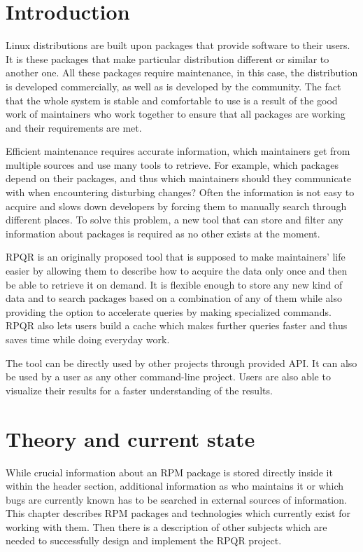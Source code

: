 \setlength{\parindent}{0em}
\setlength{\parskip}{1em}
\chapter{Introduction}

Linux distributions are built upon packages that provide software to their users. It is these
packages that make particular distribution different or similar to another one. All these packages require
maintenance, in this case, the distribution is developed commercially, as well as is developed by the community.
The fact that the whole system is stable and comfortable to use is a result of the good work of
maintainers who work together to ensure that all packages are working and their
requirements are met.

Efficient maintenance requires accurate information, which maintainers get from multiple sources
and use many tools to retrieve. For example, which packages depend on their packages, and thus which
maintainers should they communicate with when encountering disturbing changes? Often the information
is not easy to acquire and slows down developers by forcing them to manually search through different
places. To solve this problem, a new tool that can store and filter any information about
packages is required as no other exists at the moment.

RPQR is an originally proposed tool that is supposed to make maintainers' life easier by allowing them to describe how
to acquire the data only once and then be able to retrieve it on demand. It is flexible
enough to store any new kind of data and to search packages based on a combination of any of them while
also providing the option to accelerate queries by making specialized commands.
RPQR also lets users build a cache which makes further queries faster and thus saves time while
doing everyday work.

The tool can be directly used by other projects through provided API. It can also be used
by a user as any other command-line project. Users are also able to visualize their
results for a faster understanding of the results.

\chapter{Theory and current state}
While crucial information about an RPM package is stored directly inside it within the header section,
additional information as who maintains it or which bugs are currently known has to be searched
in external sources of information. This chapter describes RPM packages and technologies which
currently exist for working with them. Then there is a description of other subjects which are needed
to successfully design and implement the RPQR project.

